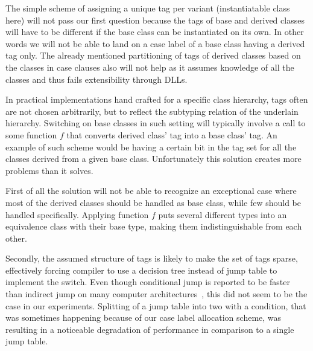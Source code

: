 \documentclass[preprint]{sigplanconf}
\begin{document}


The simple scheme of assigning a unique tag per variant (instantiatable class 
here) will not pass our first question because the tags of base and derived 
classes will have to be different if the base class can be instantiated on its 
own. In other words we will not be able to land on a case label of a base class 
having a derived tag only. The already mentioned partitioning of tags of derived 
classes based on the classes in case clauses also will not help as it assumes 
knowledge of all the classes and thus fails extensibility through DLLs.

In practical implementations hand crafted for a specific class hierarchy, tags 
often are not chosen arbitrarily, but to reflect the subtyping relation of the 
underlain hierarchy. Switching on base classes in such setting will typically 
involve a call to some function $f$ that converts derived class' tag into a base 
class' tag. An example of such scheme would be having a certain bit in the tag 
set for all the classes derived from a given base class. Unfortunately this 
solution creates more problems than it solves.

First of all the solution will not be able to recognize an exceptional case 
where most of the derived classes should be handled as base class, while few 
should be handled specifically. Applying function $f$ puts several different 
types into an equivalence class with their base type, making them 
indistinguishable from each other.

Secondly, the assumed structure of tags is likely to make the set of tags 
sparse, effectively forcing compiler to use a decision tree instead of jump 
table to implement the switch. Even though conditional jump is reported to be 
faster than indirect jump on many computer architectures~\cite[]{garrigue-98}, this did not seem to be the case in our experiments. Splitting 
of a jump table into two with a condition, that was sometimes happening because 
of our case label allocation scheme, was resulting in a noticeable degradation of 
performance in comparison to a single jump table.
\end{document}
